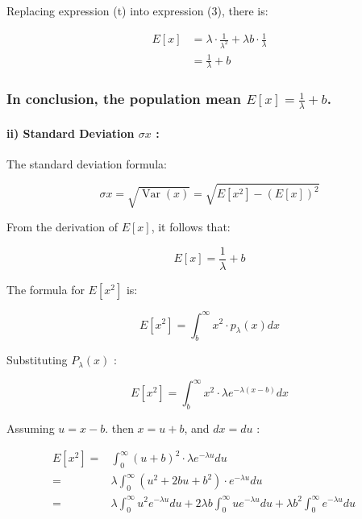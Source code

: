 \documentclass[
]{article}
\begin{document}
Replacing expression (t) into expression (3), there is:

\[
\begin{aligned}
E[x] & =\lambda \cdot \frac{1}{\lambda^{2}}+\lambda b \cdot \frac{1}{\lambda} \\
& =\frac{1}{\lambda}+b
\end{aligned}
\]

\subsubsection{\texorpdfstring{In conclusion, the population mean
\(E[x]=\frac{1}{\lambda}+b\).}{In conclusion, the population mean E{[}x{]}=\textbackslash frac\{1\}\{\textbackslash lambda\}+b.}}\label{in-conclusion-the-population-mean-exfrac1lambdab.}

\paragraph{\texorpdfstring{ii) Standard Deviation \(\sigma x\)
:}{ii) Standard Deviation \textbackslash sigma x :}}\label{ii-standard-deviation-sigma-x}

The standard deviation formula:

\[
\begin{equation}
\sigma x=\sqrt{\operatorname{Var}(x)}=\sqrt{E\left[x^{2}\right]-(E[x])^{2}} \tag{1}
\end{equation}
\]

From the derivation of \(E[x]\), it follows that:

\[
E[x]=\frac{1}{\lambda}+b \tag{2}
\]

The formula for \(E\left[x^{2}\right]\) is:

\[
\begin{equation}
E\left[x^{2}\right]=\int_{b}^{\infty} x^{2} \cdot p_{\lambda}(x) d x \tag{3}
\end{equation}
\]

Substituting \(P_{\lambda}(x)\) :

\[
\begin{equation}
E\left[x^{2}\right]=\int_{b}^{\infty} x^{2} \cdot \lambda e^{-\lambda(x-b)} d x \tag{4}
\end{equation}
\]

Assuming \(u=x-b\). then \(x=u+b\), and \(d x=d u\) :

\[
\begin{align*}
E\left[x^{2}\right]= & \int_{0}^{\infty}(u+b)^{2} \cdot \lambda e^{-\lambda u} d u \\
= & \lambda \int_{0}^{\infty}\left(u^{2}+2 b u+b^{2}\right) \cdot e^{-\lambda u} d u \\
= & \lambda \int_{0}^{\infty} u^{2} e^{-\lambda u} d u+2 \lambda b \int_{0}^{\infty} u e^{-\lambda u} d u  +\lambda b^{2} \int_{0}^{\infty} e^{-\lambda u} d u \quad  \tag{5}
\end{align*}
\]
\end{document}
